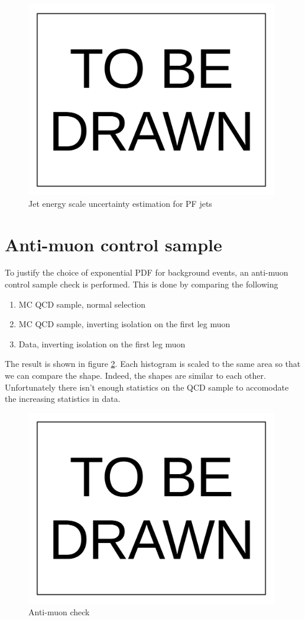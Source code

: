 \documentclass[10pt,a4paper,onecolumn]{article}
\begin{document}
\begin{figure}
\includegraphics[width=110mm]{ToBeDrawn.pdf}
\caption{Jet energy scale uncertainty estimation for PF jets}
\label{Figure_PFJetJES}
\end{figure}


\section{Anti-muon control sample}

To justify the choice of exponential PDF for background events, an anti-muon control sample check is performed.
This is done by comparing the following

\begin{enumerate}
\item MC QCD sample, normal selection
\item MC QCD sample, inverting isolation on the first leg muon
\item Data, inverting isolation on the first leg muon
\end{enumerate}

The result is shown in figure \ref{Figure_AntiMuonSingleLeg}.  Each histogram is scaled to the same area so that we can compare the shape.
Indeed, the shapes are similar to each other.  Unfortunately there isn't enough statistics on the QCD sample to accomodate the increasing statistics in data.

\begin{figure}
\includegraphics[width=110mm]{ToBeDrawn.pdf}
\caption{Anti-muon check}
\label{Figure_AntiMuonSingleLeg}
\end{figure}
\end{document}
